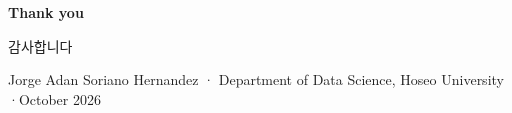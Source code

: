 \documentclass[compress]{beamer}
\begin{document}
\begin{frame}
\begin{center}
  \vfill
  {\Large\color{UBIred}\textbf{Thank you}}\par
  \vspace{10pt}
  {\large 감사합니다}\par
  \vspace{18pt}
  {\scriptsize Jorge Adan Soriano Hernandez \quad·\quad
   Department of Data Science, Hoseo University \quad·\quad October 2026}
  \vfill
\end{center}
\end{frame}
\end{document}
